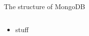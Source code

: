 \begin{frame}{The structure of MongoDB}
  \begin{columns}[onlytextwidth]
    \begin{column}{0.6\textwidth}
      \begin{itemize}
          \item stuff
      \end{itemize}
    \end{column}
    \begin{column}[t]{0.4\textwidth}
    \end{column}
  \end{columns}
\end{frame}
